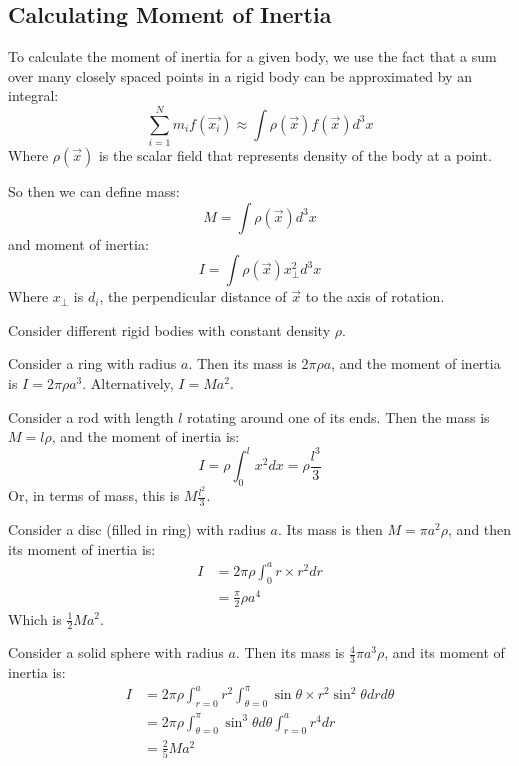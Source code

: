 \documentclass[../Main.tex]{subfiles}
\begin{document}
\subsection{Calculating Moment of Inertia}
To calculate the moment of inertia for a given body, we use the fact that a sum over many closely spaced points in a rigid body can be approximated by an integral:
\begin{equation*}
    \sum_{i=1}^{N} m_i f(\vec{x_i}) \approx \int \rho(\vec{x})f(\vec{x}) d^3x
\end{equation*}
Where $\rho(\vec{x})$ is the scalar field that represents density of the body at a point.\par
So then we can define mass:
\begin{equation}
    M = \int \rho(\vec{x}) d^3x
    \label{eqnIntegralMass}
\end{equation}
and moment of inertia:
\begin{equation}
    I = \int \rho(\vec{x}) x_\perp^2 d^3x
    \label{eqnIntegralMomentInertia}
\end{equation}
Where $x_\perp$ is $d_i$, the perpendicular distance of $\vec{x}$ to the axis of rotation.
\begin{examples}{
        Consider different rigid bodies with constant density $\rho$.
    }
    \item Consider a ring with radius $a$. Then its mass is $2\pi \rho a$, and the moment of inertia is $I = 2 \pi \rho a^3$. Alternatively, $I = Ma^2$.
    \item Consider a rod with length $l$ rotating around one of its ends. Then the mass is $M = l \rho$, and the moment of inertia is:
        \begin{equation*}
            I = \rho \int_0^l x^2 dx = \rho \frac{l^3}{3}
        \end{equation*}
        Or, in terms of mass, this is $M\frac{l^2}{3}$.
    \item Consider a disc (filled in ring) with radius $a$. Its mass is then $M = \pi a^2 \rho$, and then its moment of inertia is:
        \begin{align*}
            I &= 2 \pi \rho \int_0^a r \times r^2 dr \\
            &= \frac{\pi}{2} \rho a^4
        \end{align*}
        Which is $\frac{1}{2} M a^2$.
    \item Consider a solid sphere with radius $a$. Then its mass is $\frac{4}{3} \pi a^3 \rho$, and its moment of inertia is:
        \begin{align*}
            I &= 2 \pi \rho \int_{r=0}^a r^2 \int_{\theta = 0}^\pi \sin{\theta} \times r^2 \sin^2{\theta} dr d\theta \\
            &= 2 \pi \rho \int_{\theta = 0}^\pi \sin^3{\theta} d\theta \int_{r=0}^a r^4 dr \\
            &= \frac{2}{5} Ma^2
        \end{align*}
\end{examples}
\end{document}
